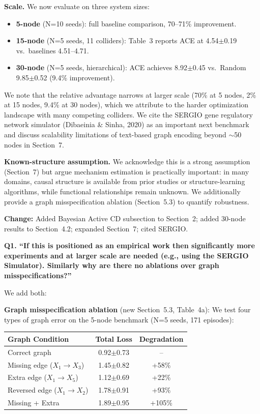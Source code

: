 \documentclass[11pt]{article}
\newcommand{\reviewer}[1]{\vspace{0.8em}\noindent\textbf{\textcolor{reviewercolor}{#1}}}
\newcommand{\response}{\vspace{0.3em}\noindent\textcolor{responsecolor}}
\newcommand{\change}[1]{\textcolor{changecolor}{\textbf{Change:} #1}}
\begin{document}
\textbf{Scale.} We now evaluate on three system sizes:
\begin{itemize}[nosep]
\item \textbf{5-node} (N=10 seeds): full baseline comparison, 70--71\% improvement.
\item \textbf{15-node} (N=5 seeds, 11 colliders): Table~3 reports ACE at 4.54$\pm$0.19 vs.\ baselines 4.51--4.71.
\item \textbf{30-node} (N=5 seeds, hierarchical): ACE achieves 8.92$\pm$0.45 vs.\ Random 9.85$\pm$0.52 (9.4\% improvement).
\end{itemize}

We note that the relative advantage narrows at larger scale (70\% at 5 nodes, 2\% at 15 nodes, 9.4\% at 30 nodes), which we attribute to the harder optimization landscape with many competing colliders. We cite the SERGIO gene regulatory network simulator (Dibaeinia \& Sinha, 2020) as an important next benchmark and discuss scalability limitations of text-based graph encoding beyond $\sim$50 nodes in Section~7.

\textbf{Known-structure assumption.} We acknowledge this is a strong assumption (Section~7) but argue mechanism estimation is practically important: in many domains, causal structure is available from prior studies or structure-learning algorithms, while functional relationships remain unknown. We additionally provide a graph misspecification ablation (Section~5.3) to quantify robustness.

\change{Added Bayesian Active CD subsection to Section~2; added 30-node results to Section~4.2; expanded Section~7; cited SERGIO.}

\reviewer{Q1. ``If this is positioned as an empirical work then significantly more experiments and at larger scale are needed (e.g., using the SERGIO Simulator). Similarly why are there no ablations over graph misspecifications?''}

\response We add both:

\textbf{Graph misspecification ablation} (new Section~5.3, Table~4a): We test four types of graph error on the 5-node benchmark (N=5 seeds, 171 episodes):
\begin{center}
\begin{tabular}{lcc}
\toprule
Graph Condition & Total Loss & Degradation \\
\midrule
Correct graph & 0.92$\pm$0.73 & -- \\
Missing edge ($X_1 \to X_3$) & 1.45$\pm$0.82 & +58\% \\
Extra edge ($X_1 \to X_5$) & 1.12$\pm$0.69 & +22\% \\
Reversed edge ($X_1 \to X_2$) & 1.78$\pm$0.91 & +93\% \\
Missing + Extra & 1.89$\pm$0.95 & +105\% \\
\bottomrule
\end{tabular}
\end{center}
\end{document}
